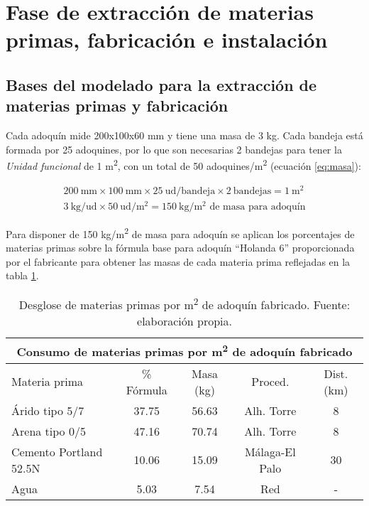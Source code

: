 \section{Fase de extracción de materias primas, fabricación e instalación}

\subsection{Bases del modelado para la extracción de materias primas y fabricación}\label{sec:basesfabricacion}
Cada adoquín mide 200x100x60 \si{mm} y tiene una masa de 3 \si{kg}. Cada bandeja está formada por 25 adoquines, por lo que son necesarias 2 bandejas para tener la \textit{Unidad funcional} de 1 \si{m^2}, con un total de 50 adoquines/\si{m^2} (ecuación \ref{eq:masa}):

\begin{gather}
\mathrm{200\ mm \times 100\ mm \times 25\ ud/bandeja \times 2\ bandejas = 1\ m^2}\\
\mathrm{3\ kg/ud \times 50\ ud/m^2 = 150\ kg/m^2 \text{ de masa para adoquín}}\label{eq:masa}
\end{gather}

Para disponer de 150 \si{kg/m^2} de masa para adoquín se aplican los porcentajes de materias primas sobre la fórmula base para adoquín ``Holanda 6'' proporcionada por el fabricante para obtener las masas de cada materia prima reflejadas en la tabla \ref{desglosemateriasprimas}.

\begin{table}[!htb]
\centering
\begin{tabular}{lcccc}
\toprule
\multicolumn{5}{c}{Consumo de materias primas por \si{m^2} de adoquín fabricado}\\
\midrule
Materia prima & \% Fórmula & Masa (\si{kg}) & Proced. & Dist. (\si{km})\\
\midrule
Árido tipo 5/7 & 37.75 & 56.63 & Alh. Torre & 8\\
Arena tipo 0/5 & 47.16 & 70.74 & Alh. Torre & 8\\
Cemento Portland 52.5N & 10.06 & 15.09 & Málaga-El Palo & 30\\
Agua & 5.03 & 7.54 & Red & -\\
\bottomrule
\end{tabular}
\caption[Desglose de materias primas por \si{m^2} de adoquín fabricado.]{Desglose de materias primas por \si{m^2} de adoquín fabricado. Fuente: elaboración propia.}
\label{desglosemateriasprimas}
\end{table}

